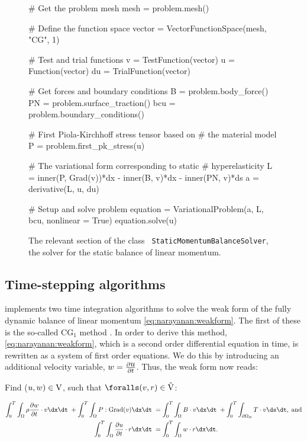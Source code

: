 \begin{figure}[ht]
\begin{python}
# Get the problem mesh
mesh = problem.mesh()

# Define the function space
vector = VectorFunctionSpace(mesh, "CG", 1)

# Test and trial functions
v = TestFunction(vector)
u = Function(vector)
du = TrialFunction(vector)

# Get forces and boundary conditions
B = problem.body_force()
PN = problem.surface_traction()
bcu = problem.boundary_conditions()

# First Piola-Kirchhoff stress tensor based on
# the material model
P = problem.first_pk_stress(u)

# The variational form corresponding to static
# hyperelasticity
L = inner(P, Grad(v))*dx - inner(B, v)*dx - inner(PN, v)*ds
a = derivative(L, u, du)

# Setup and solve problem
equation = VariationalProblem(a, L, bcu,
                              nonlinear = True)
equation.solve(u)
\end{python}
\caption{The relevant section of the class {\tt
    StaticMomentumBalanceSolver}, the solver for the static balance of
  linear momentum.}
\label{code:narayanan:staticmomentumsolver}
\end{figure}

\subsection{Time-stepping algorithms}

\twist{} implements two time integration algorithms to solve the weak
form of the fully dynamic balance of linear momentum
\eqref{eq:narayanan:weakform}. The first of these is the
so-called CG$_{1}$ method \citep{ErikssonEstepHansboEtAl1996}. In order
to derive this method, \eqref{eq:narayanan:weakform}, which is
a second order differential equation in time, is rewritten as a system
of first order equations. We do this by introducing an additional
velocity variable, $\mbox{$ w$} = \frac{\partial \mbox{$ u$}}{\partial t}$. Thus, the
weak form now reads:

\noindent Find ($\mbox{$ u$}, \mbox{$ w$}) \in \mathrm{V}$, such that $\foralls (\bv,
\br) \in \hat{\mathrm{V}}$:

\begin{equation}
\begin{split}
  \int_{0}^{T} \int_{\Omega} \rho \frac{\partial \bw}{\partial t}
\cdot \bv \dx \dt\; + \int_{0}^{T} \int_{\Omega}
\bP:\mathrm{Grad}(\bv) \dx \dt\; &= \int_{0}^{T} \int_{\Omega} \bB
\cdot \bv \dx \dt\; + \int_{0}^{T} \int_{\partial\Omega_{\mathrm{N}}}
\bT \cdot \bv \ds \dt, \; \mathrm{and}\\ \int_{0}^{T} \int_{\Omega}
\frac{\partial \bu}{\partial t} \cdot \br \dx \dt\; &= \int_{0}^{T}
\int_{\Omega} \bw \cdot \br \dx \dt.
\end{split}
\label{eq:narayanan:cg1weakform}
\end{equation}

